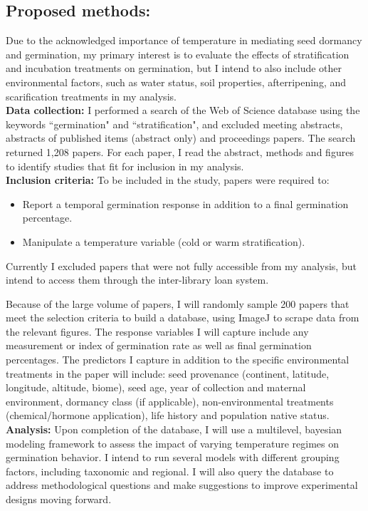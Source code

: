\documentclass[12pt]{article}\usepackage[]{graphicx}\usepackage[]{color}
\begin{document}
\subsection*{Proposed methods:}
\indent\indent Due to the acknowledged importance of temperature in mediating seed dormancy and germination, my primary interest is to evaluate the effects of stratification and incubation treatments on germination, but I intend to also include other environmental factors, such as water status, soil properties, afterripening, and scarification treatments in my analysis.\\
\indent\textbf{Data collection:} I performed a search of the Web of Science database using the keywords ``germination" and ``stratification", and excluded meeting abstracts, abstracts of published items (abstract only) and proceedings papers. The search returned 1,208 papers. For each paper, I read the abstract, methods and figures to identify studies that fit for inclusion in my analysis.\\
\indent\textbf{Inclusion criteria:} To be included in the study, papers were required to:
\begin{itemize}
\item Report a temporal germination response in addition to a final germination percentage.
\item Manipulate a temperature variable (cold or warm stratification).
\end{itemize}
Currently I excluded papers that were not fully accessible from my analysis, but intend to access them through the inter-library loan system. 
\par Because of the large volume of papers, I will randomly sample 200 papers that meet the selection criteria to build a database, using ImageJ to scrape data from the relevant figures. The response variables I will capture include any measurement or index of germination rate as well as final germination percentages. The predictors I capture in addition to the specific environmental treatments in the paper will include: seed provenance (continent, latitude, longitude, altitude, biome), seed age, year of collection and maternal environment, dormancy class (if applicable), non-environmental treatments (chemical/hormone application), life history and population native status.\\
\indent\indent\textbf{Analysis:} Upon completion of the database, I will use a multilevel, bayesian modeling framework to assess the impact of varying temperature regimes on germination behavior. I intend to run several models with different grouping factors, including taxonomic and regional. I will also query the database to address methodological questions and make suggestions to improve experimental designs moving forward. 
\end{document}
